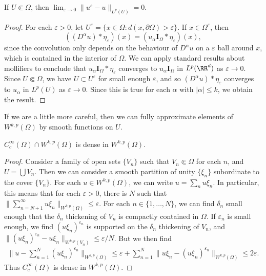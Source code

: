 \begin{theorem}
  If $U \Subset \Omega$, then $\lim_{\varepsilon \to 0} \| u^\varepsilon - u \|_{L^p(U)} = 0$.
\end{theorem}
\begin{proof}
  For each $\varepsilon > 0$, let $U^\varepsilon = \{ x \in \Omega: d(x,\partial \Omega) > \varepsilon \}$. If $x \in \Omega^\varepsilon$, then
  \[ ((D^\alpha u) * \eta_\varepsilon)(x) = (u_\alpha \mathbf{I}_\Omega * \eta_\varepsilon)(x), \]
  since the convolution only depends on the behaviour of $D^\alpha u$ on a $\varepsilon$ ball around $x$, which is contained in the interior of $\Omega$. We can apply standard results about mollifiers to conclude that $u_\alpha \mathbf{I}_\Omega * \eta_\varepsilon$ converges to $u_\alpha \mathbf{I}_\Omega$ in $L^p(\RR^d)$ as $\varepsilon \to 0$. Since $U \Subset \Omega$, we have $U \subset U^\varepsilon$ for small enough $\varepsilon$, and so $(D^\alpha u) * \eta_\varepsilon$ converges to $u_\alpha$ in $L^p(U)$ as $\varepsilon \to 0$. Since this is true for each $\alpha$ with $|\alpha| \leq k$, we obtain the result.
\end{proof}

If we are a little more careful, then we can fully approximate elements of $W^{k,p}(\Omega)$ by smooth functions on $U$.

\begin{theorem}
  $C^\infty_c(\Omega) \cap W^{k,p}(\Omega)$ is dense in $W^{k,p}(\Omega)$.
\end{theorem}
\begin{proof}
  Consider a family of open sets $\{ V_n \}$ such that $V_n \Subset \Omega$ for each $n$, and $U = \bigcup V_n$. Then we can consider a smooth partition of unity $\{ \xi_n \}$ subordinate to the cover $\{ V_n \}$. For each $u \in W^{k,p}(\Omega)$, we can write $u = \sum_n u \xi_n$. In particular, this means that for each $\varepsilon > 0$, there is $N$ such that $\| \sum_{n = N+1}^\infty u \xi_n \|_{W^{k,p}(\Omega)} \leq \varepsilon$. For each $n \in \{ 1, \dots, N \}$, we can find $\delta_n$ small enough that the $\delta_n$ thickening of $V_n$ is compactly contained in $\Omega$. If $\varepsilon_n$ is small enough, we find $(u \xi_n)^{\varepsilon_n}$ is supported on the $\delta_n$ thickening of $V_n$, and $\| (u \xi_n)^{\varepsilon_n} - u \xi_n \|_{W^{k,p}(V_n)} \leq \varepsilon / N$. But we then find
  \begin{align*}
    \| u - \sum_{n = 1}^N (u \xi_n)^{\varepsilon_n} \|_{W^{k,p}(\Omega)} \leq \varepsilon + \sum_{n = 1}^N \| u \xi_n - (u \xi_n)^{\varepsilon_n} \|_{W^{k,p}(\Omega)} \leq 2\varepsilon.
  \end{align*}
  Thus $C_c^\infty(\Omega)$ is dense in $W^{k,p}(\Omega)$.
\end{proof}

